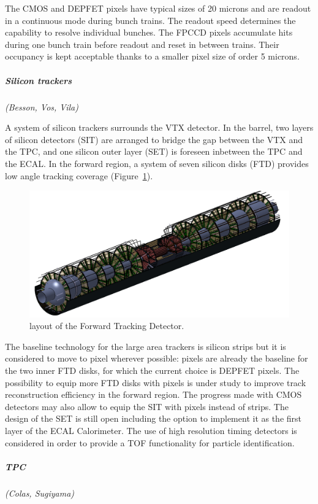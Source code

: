 \vspace{0.5cm}
The CMOS and DEPFET pixels have typical sizes of 20 microns and are readout in a continuous mode during bunch trains. The readout speed determines the capability to resolve individual bunches. The FPCCD pixels accumulate hits during one bunch train before readout and reset in between trains. Their occupancy is kept acceptable thanks to a smaller pixel size of order 5 microns.  


\vspace{1cm}
\subparagraph*{\bf Silicon trackers}
\textit{(Besson, Vos, Vila)}

A system of silicon trackers surrounds the VTX detector. In the barrel, two layers of silicon detectors (SIT) are arranged to bridge the gap between the VTX and the TPC, and one silicon outer layer (SET) is foreseen inbetween the TPC and the ECAL. In the forward region, a system of seven silicon disks (FTD) provides low angle tracking coverage (Figure~\ref{fig:det:FTD}).

\begin{figure}[t!]
\centering
\includegraphics[width=0.6\hsize]{Detector/fig/FTD.png}
\caption{layout of the Forward Tracking Detector.}
\label{fig:det:FTD}
\end{figure}

The baseline technology for the large area trackers is silicon strips but it is considered to move to pixel wherever possible: pixels are already the baseline for the two inner FTD disks, for which the current choice is DEPFET pixels. The possibility to equip more FTD disks with pixels is under study to improve track reconstruction efficiency in the forward region. The progress made with CMOS detectors may also allow to equip the SIT with pixels instead of strips. The design of the SET is still open including the option to implement it as the first layer of the ECAL Calorimeter. The use of high resolution timing detectors is considered in order to provide a TOF functionality for particle identification.   

\vspace{1cm}
\subparagraph*{\bf TPC}
\textit{(Colas, Sugiyama)}

